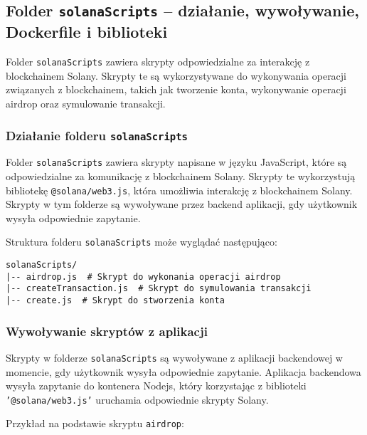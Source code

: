 \subsection{Folder \texttt{solanaScripts} – działanie, wywoływanie, Dockerfile i biblioteki}

Folder \texttt{solanaScripts} zawiera skrypty odpowiedzialne za interakcję z blockchainem Solany. Skrypty te są wykorzystywane do wykonywania operacji związanych z blockchainem, takich jak tworzenie konta, wykonywanie operacji airdrop oraz symulowanie transakcji.

\subsubsection{Działanie folderu \texttt{solanaScripts}}

Folder \texttt{solanaScripts} zawiera skrypty napisane w języku JavaScript, które są odpowiedzialne za komunikację z blockchainem Solany. Skrypty te wykorzystują bibliotekę \texttt{@solana/web3.js}, która umożliwia interakcję z blockchainem Solany. Skrypty w tym folderze są wywoływane przez backend aplikacji, gdy użytkownik wysyła odpowiednie zapytanie.

Struktura folderu \texttt{solanaScripts} może wyglądać następująco:

\begin{verbatim}
solanaScripts/
|-- airdrop.js  # Skrypt do wykonania operacji airdrop
|-- createTransaction.js  # Skrypt do symulowania transakcji
|-- create.js  # Skrypt do stworzenia konta
\end{verbatim}

\subsubsection{Wywoływanie skryptów z aplikacji}

Skrypty w folderze \texttt{solanaScripts} są wywoływane z aplikacji backendowej w momencie, gdy użytkownik wysyła odpowiednie zapytanie. Aplikacja backendowa  wysyła zapytanie do kontenera Nodejs, który korzystając z biblioteki \texttt{'@solana/web3.js'} uruchamia odpowiednie skrypty Solany.

Przykład na podstawie skryptu \texttt{airdrop}:

